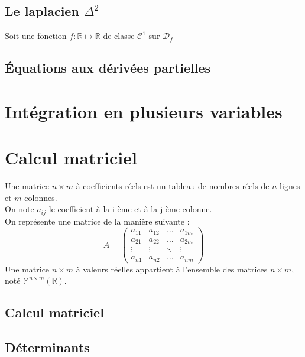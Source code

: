 \section{Le laplacien $\Delta^2$}
\begin{defi}
Soit une fonction $f:\mathbb{R}\mapsto\mathbb{R}$ de classe $\mathscr{C}^1$ sur $\mathscr{D}_f$
\end{defi}
\section{Équations aux dérivées partielles}
\chapter{Intégration en plusieurs variables}
\chapter{Calcul matriciel}
\begin{defi}
Une matrice $n\times m$ à  coefficients réels est un tableau de nombres réels de $n$ lignes et $m$ colonnes.\\
On note $a_{ij}$ le coefficient à la i-ème  et à la j-ème colonne.\\
On représente une matrice de la manière suivante :
$$A = \begin{pmatrix}a_{11} & a_{12} & \hdots & a_{1m}\\a_{21} & a_{22} & \hdots & a_{2m}\\ \vdots & \vdots & \ddots & \vdots\\ a_{n1} & a_{n2} & \hdots & a_{nm} \end{pmatrix}$$
\newline
Une matrice $n\times m$ à valeurs réelles appartient à l'ensemble des matrices $n\times m$, noté $\mathbb{M}^{n\times m}(\mathbb{R})$.
\end{defi}
\section{Calcul matriciel}
\section{Déterminants}
